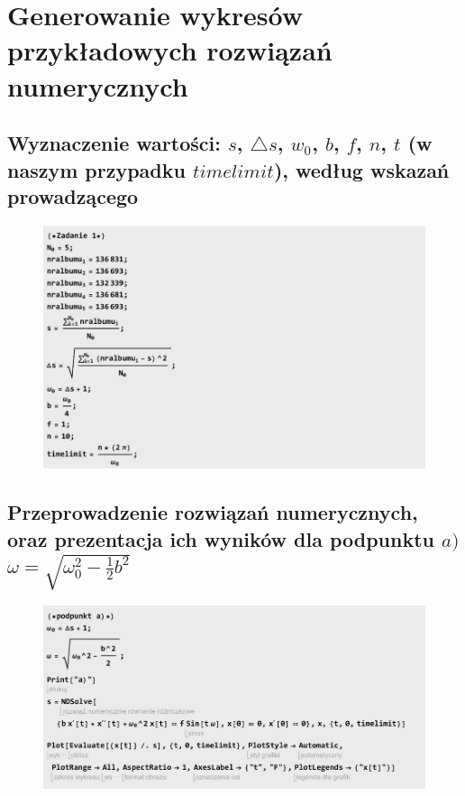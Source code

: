 \documentclass[polish,polish,a4paper]{article}
\begin{document}
		\section{Generowanie wykresów przykładowych rozwiązań numerycznych}
		\subsection{Wyznaczenie wartości: $s$, $\triangle s$, $w_{0}$, $b$, $f$, $n$, $t$ (w naszym przypadku $timelimit$),  według wskazań prowadzącego}
		
		\begin{figure}[H]
			\centering
			\includegraphics[scale=1]{zad1}
		\end{figure}

		\subsection{Przeprowadzenie rozwiązań numerycznych, oraz prezentacja ich wyników dla podpunktu $ a) $ $\omega = \sqrt{\omega_{0}^2 - \frac{1}{2}b^2}$}
		
				\begin{figure}[H]
			\centering
			\includegraphics[scale=1]{1a}
		\end{figure}
	
\end{document}
